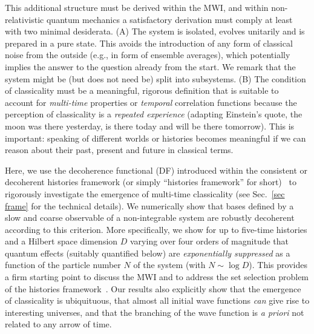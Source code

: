 \documentclass[pre,twocolumn,10pt,aps,longbibliography,nofootinbib]{revtex4-1}
\newcommand{\blue}[1]{#1}
\newcommand{\new}[1]{#1}
\begin{document}
This additional structure must be derived \new{within the MWI}, and within non-relativistic quantum mechanics a satisfactory derivation must comply at least with two minimal desiderata. (A) The system is isolated, evolves unitarily and is prepared in a pure state. This avoids the introduction of any form of classical noise from the outside (e.g., in form of ensemble averages), which potentially implies the answer to the question already from the start. We remark that the system might be (but does not need be) split into subsystems. (B) The condition of classicality must be a meaningful, rigorous definition that is suitable to account for \emph{multi-time} properties or \emph{temporal} correlation functions because the perception of classicality is a \emph{repeated experience} (adapting Einstein's quote, the moon was there yesterday, is there today and will be there tomorrow). This is important: speaking of different worlds or histories becomes meaningful if we can reason about their past, present and future in classical terms.

Here, we use the decoherence functional (DF) introduced within the consistent or decoherent histories framework (or simply ``histories framework'' for short)~\cite{GriffithsJSP1984, GellMannHartleInBook1990, OmnesRMP1992, DowkerHalliwellPRD1992, GellMannHartlePRD1993, HalliwellANY1995, DowkerKentJSP1996, GriffithsBook2002, GellMannHartlePRA2007, Griffiths2019} \new{to} rigorous\new{ly investigate the emergence} of multi-time classicality (see Sec.~\ref{sec frame} for the technical details). We numerically show that bases defined by a slow and coarse observable of a non-integrable system \new{are robustly decoherent according to this criterion}. More specifically, we show for up to five-time histories and a Hilbert space dimension $D$ varying over four orders of magnitude that quantum effects (suitably quantified below) are \emph{exponentially suppressed} as a function of the particle number $N$ of the system (with $N\sim\log D$). This provides a firm starting point to discuss the MWI \new{and to address the set selection problem of the histories framework~\cite{PazZurekPRD1993, DowkerKentPRL1995, DowkerKentJSP1996, RiedelZurekZwolakPRA2016}.} \blue{Our results also explicitly show} that the emergence of classicality is ubiquituous, that almost all initial wave functions \new{\emph{can}} give rise to interesting universes, and that the branching of the wave function is \emph{a priori} not related to any arrow of time.
\end{document}
